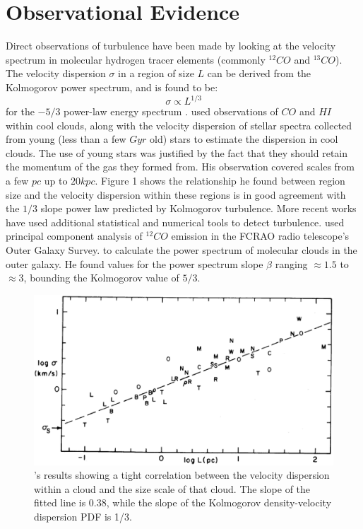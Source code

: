 \documentclass[12pt, preprint]{aastex}
\begin{document}
\section{Observational Evidence}
Direct observations of turbulence have been made by looking at the velocity
spectrum in molecular hydrogen tracer elements (commonly $^{12}CO$ and
$^{13}CO$). The velocity dispersion $\sigma$ in a region of size $L$ can be
derived from the Kolmogorov power spectrum, and is found to be:
$$\sigma \propto L^{1/3}$$
for the $-5/3$ power-law energy spectrum \citep{larson1979}.
\citet{larson1979} used observations of $CO$ and $HI$ within cool
clouds, along with the velocity dispersion of stellar spectra collected from
young (less than a few $Gyr$ old) stars to estimate the dispersion in cool clouds.  
The use of young stars was justified by the fact that they should retain the
momentum of the gas they formed from.  His
observation covered scales from a few $pc$ up to $20 kpc$.  Figure 1 shows
the relationship he found between region size and the velocity dispersion
within these regions is in good agreement with the $1/3$ slope power law
predicted by Kolmogorov turbulence.
More recent works have used additional statistical and numerical tools to detect
turbulence.  \citet{brunt2003} used principal component analysis of $^{12}CO$
emission in the FCRAO radio telescope's Outer Galaxy Survey.  to calculate the
power spectrum of molecular clouds in the outer galaxy.  He found values for the
power spectrum slope $\beta$ ranging $\approx 1.5$ to $\approx 3$, bounding the
Kolmogorov value of $5/3$.

\begin{figure}[H]
	\centering
	\includegraphics[scale=0.4]{figures/larsonlaw_larson1981.eps}
	\caption{\citet{larson1981}'s results showing a tight correlation between
	the velocity dispersion within a cloud and the size scale of that cloud.
The slope of the fitted line is 0.38, while the slope of the Kolmogorov
density-velocity dispersion PDF is 1/3.}
\end{figure}
\end{document}
